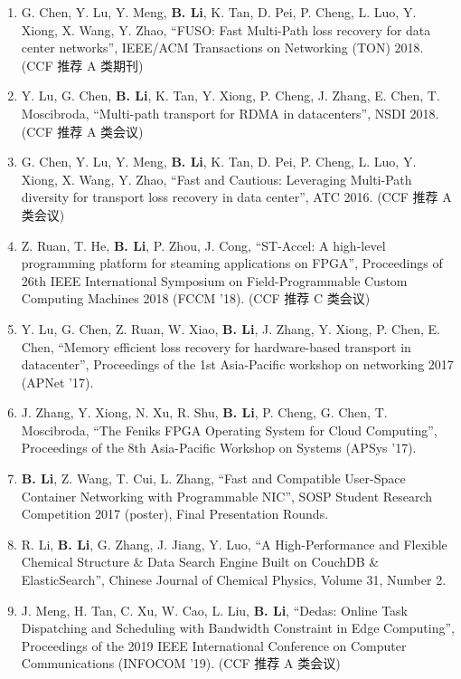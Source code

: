 \begin{publications}
\begin{enumerate}
\item G. Chen, Y. Lu, Y. Meng, \textbf{B. Li}, K. Tan, D. Pei, P. Cheng, L. Luo, Y. Xiong, X. Wang, Y. Zhao, ``FUSO: Fast Multi-Path loss recovery for data center networks'', IEEE/ACM Transactions on Networking (TON) 2018. (CCF 推荐 A 类期刊)
\item Y. Lu, G. Chen, \textbf{B. Li}, K. Tan, Y. Xiong, P. Cheng, J. Zhang, E. Chen, T. Moscibroda, ``Multi-path transport for RDMA in datacenters'', NSDI 2018. (CCF 推荐 A 类会议)
\item G. Chen, Y. Lu, Y. Meng, \textbf{B. Li}, K. Tan, D. Pei, P. Cheng, L. Luo, Y. Xiong, X. Wang, Y. Zhao, “Fast and Cautious: Leveraging Multi-Path diversity for transport loss recovery in data center”, ATC 2016. (CCF 推荐 A 类会议)
\item Z. Ruan, T. He, \textbf{B. Li}, P. Zhou, J. Cong, “ST-Accel: A high-level programming platform for steaming applications on FPGA”, Proceedings of 26th IEEE International Symposium on Field-Programmable Custom Computing Machines 2018 (FCCM '18). (CCF 推荐 C 类会议)
\item Y. Lu, G. Chen, Z. Ruan, W. Xiao, \textbf{B. Li}, J. Zhang, Y. Xiong, P. Chen, E. Chen, ``Memory efficient loss recovery for hardware-based transport in datacenter'', Proceedings of the 1st Asia-Pacific workshop on networking 2017 (APNet '17).
\item J. Zhang, Y. Xiong, N. Xu, R. Shu, \textbf{B. Li}, P. Cheng, G. Chen, T. Moscibroda, ``The Feniks FPGA Operating System for Cloud Computing'', Proceedings of the 8th Asia-Pacific Workshop on Systems (APSys '17).
\item \textbf{B. Li}, Z. Wang, T. Cui, L. Zhang, ``Fast and Compatible User-Space Container Networking with Programmable NIC'', SOSP Student Research Competition 2017 (poster), Final Presentation Rounds.
\item R. Li, \textbf{B. Li}, G. Zhang, J. Jiang, Y. Luo, ``A High-Performance and Flexible Chemical Structure \& Data Search Engine Built on CouchDB \& ElasticSearch'', Chinese Journal of Chemical Physics, Volume 31, Number 2.
\item J. Meng, H. Tan, C. Xu, W. Cao, L. Liu, \textbf{B. Li}, ``Dedas: Online Task Dispatching and Scheduling with Bandwidth Constraint in Edge Computing'', Proceedings of the 2019 IEEE International Conference on Computer Communications (INFOCOM '19). (CCF 推荐 A 类会议)
\end{enumerate}


\end{publications}
